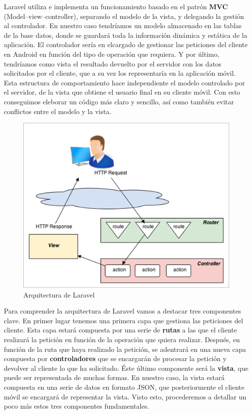 Laravel utiliza e implementa un funcionamiento basado en el patrón \textbf{MVC} (Model–view–controller), separando el modelo de la vista, y delegando la gestión al controlador. En nuestro caso tendríamos un modelo almacenado en las tablas de la base datos, donde se guardará toda la información dinámica y estática de la aplicación. El controlador sería en elcargado de gestionar las peticiones del cliente en Android en función del tipo de operación que requiera. Y por último, tendríamos como vista el resultado devuelto por el servidor con los datos solicitados por el cliente, que a su vez los representaría en la aplicación móvil. Esta estructura de comportamiento hace independiente el modelo controlado por el servidor, de la vista que obtiene el usuario final en su cliente móvil. Con esto conseguimos eleborar un código más claro y sencillo, así como también evitar conflictos entre el modelo y la vista.

\begin{figure}[H]
\centering
\includegraphics[keepaspectratio, scale=0.8]{Media/Captures/laravelArch.jpg}
\caption{Arquitectura de Laravel}
\label{fig:laravelArch}
\end{figure}

Para comprender la arquitectura de Laravel vamos a destacar tres componentes clave. En primer lugar tenemos una primera capa que gestiona las peticiones del cliente. Esta capa estará compuesta por una serie de \textbf{rutas} a las que el cliente realizará la petición en función de la operación que quiera realizar. Después, en función de la ruta que haya realizado la petición, se adentrará en una nueva capa compuesta por \textbf{controladores} que se encargarán de procesar la petición y devolver al cliente lo que ha solicitado. Éste último componente será la \textbf{vista}, que puede ser representada de muchas formas. En nuestro caso, la vista estará compuesta en una serie de datos en formato JSON, que posteriormente el cliente móvil se encargará de representar la vista. Visto esto, procederemos a detallar un poco más estos tres componentes fundamentales.

